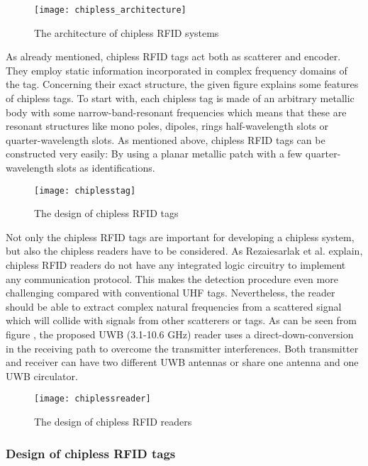 \begin{figure}
\centering
\texttt{[image: chipless\_architecture]}
\caption{\label{fig:chipless_architecture} The architecture of chipless RFID systems \cite[p.17]{chipless}} 
\end{figure}

As already mentioned, chipless RFID tags act both as scatterer and encoder. They employ static information incorporated in complex frequency domains of the tag\cite[p.18 ff.]{chipless}. Concerning their exact structure, the given figure \pageref{fig:chipless_tag} explains some features of chipless tags. To start with, each chipless tag is made of an arbitrary metallic body with some narrow-band-resonant frequencies which means that these are resonant structures like mono poles, dipoles, rings half-wavelength slots or quarter-wavelength slots. 
As mentioned above, chipless RFID tags can be constructed very easily: By using a planar metallic patch with a few quarter-wavelength slots as identifications.

\begin{figure}
\centering
\texttt{[image: chiplesstag]}
\caption{\label{fig:chipless_tag} The design of chipless RFID tags \cite[p.19]{chipless}} 
\end{figure}

Not only the chipless RFID tags are important for developing a chipless system, but also the chipless readers have to be considered. As Rezaiesarlak et al. \cite[p.18 ff.]{chipless} explain, chipless RFID readers do not have any integrated logic circuitry to implement any communication protocol. This makes the detection procedure even more challenging compared with conventional UHF tags. Nevertheless, the reader should be able to extract complex natural frequencies from a scattered signal which will collide with signals from other scatterers or tags. 
As can be seen from figure \pageref{fig:chipless_reader}, the proposed \ac{UWB} (3.1-10.6 GHz) reader uses a direct-down-conversion in the receiving path to overcome the transmitter interferences. Both transmitter and receiver can have two different UWB antennas or share one antenna and one UWB circulator.   

\begin{figure}
\centering
\texttt{[image: chiplessreader]}
\caption{\label{fig:chipless_reader} The design of chipless RFID readers \cite[p.20]{chipless}} 
\end{figure}

\subsubsection{Design of chipless RFID tags} 

